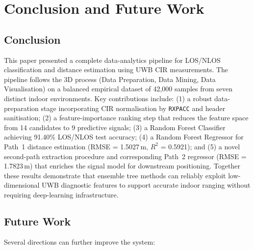 \documentclass[conference]{IEEEtran}
\begin{document}
\section{Conclusion and Future Work}

\subsection{Conclusion}
This paper presented a complete data-analytics pipeline for LOS/NLOS classification
and distance estimation using UWB CIR measurements. The pipeline follows the 3D
process (Data Preparation, Data Mining, Data Visualisation) on a balanced empirical
dataset of 42{,}000 samples from seven distinct indoor environments. Key contributions
include: (1) a robust data-preparation stage incorporating CIR normalisation by
\texttt{RXPACC} and header sanitisation; (2) a feature-importance ranking step that
reduces the feature space from 14 candidates to 9 predictive signals; (3) a
Random Forest Classifier achieving 91.40\% LOS/NLOS test accuracy; (4) a
Random Forest Regressor for Path~1 distance estimation (RMSE = 1.5027\,m,
$R^{2}$ = 0.5921); and (5) a novel second-path extraction procedure and corresponding
Path~2 regressor (RMSE = 1.7823\,m) that enriches the signal model for downstream
positioning. Together these results demonstrate that ensemble tree methods can
reliably exploit low-dimensional UWB diagnostic features to support accurate indoor
ranging without requiring deep-learning infrastructure.

\subsection{Future Work}
Several directions can further improve the system:
\end{document}

